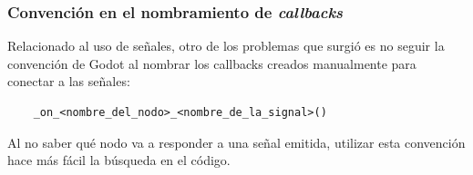 \subsubsection{Convención en el nombramiento de \textit{callbacks}}

\noindent Relacionado al uso de señales, otro de los problemas que surgió es no seguir la convención de 
Godot al nombrar los callbacks creados manualmente para conectar a las señales:

\begin{lstlisting}
    _on_<nombre_del_nodo>_<nombre_de_la_signal>()
\end{lstlisting}

Al no saber qué nodo va a responder a una señal emitida, utilizar esta convención hace más 
fácil la búsqueda en el código.
